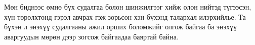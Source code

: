 \documentclass[10pt,twocolumn,letterpaper]{article}
\renewcommand{\refname}{Эшлэлүүд}
\begin{document}
Мөн биднээс өмнө бүх судалгаа болон шинжилгээг хийж олон нийтэд түгээсэн, хүн төрөлхтөнд гэрэл авчрах гэж зорьсон хэн бүхэнд талархал илэрхийлье. Та бүхэн л энэхүү судалгааны ажил орших боломжийг олгож байгаа ба энэхүү аваргуудын мөрөн дээр зогсож байгаадаа баяртай байна.

\clearpage
\twocolumn

{\small
\renewcommand{\refname}{Эшлэлүүд}


}
\end{document}
